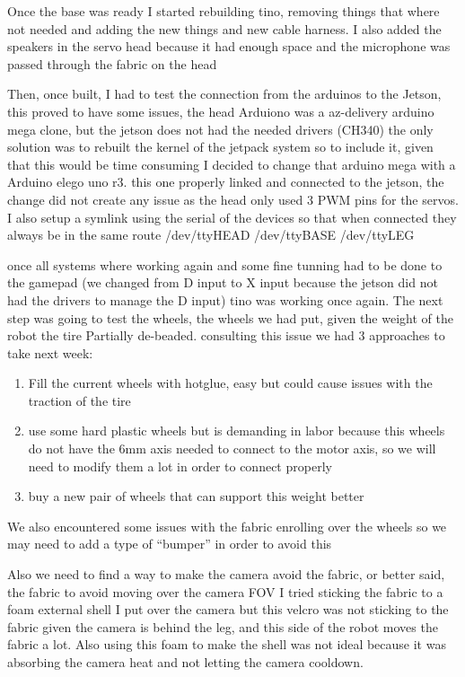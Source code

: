 Once the base was ready I started rebuilding tino, removing things that where not needed and adding the new things and new cable harness. I also added the speakers in the servo head because it had enough space and the microphone was passed through the fabric on the head

Then, once built, I had to test the connection from the arduinos to the Jetson, this proved to have some issues, the head Arduiono was a az-delivery arduino mega clone, but the jetson does not had the needed drivers (CH340) the only solution was to rebuilt the kernel of the jetpack system so to include it, given that this would be time consuming I decided to change that arduino mega with a Arduino elego uno r3. this one properly linked and connected to the jetson, the change did not create any issue as the head only used 3 PWM pins for the servos.
I also setup a symlink using the serial of the devices so that when connected they always be in the same route /dev/ttyHEAD /dev/ttyBASE /dev/ttyLEG

once all systems where working again and some fine tunning had to be done to the gamepad (we changed from D input to X input because the jetson did not had the drivers to manage the D input) tino was working once again. The next step was going to test the wheels, the wheels we had put, given the weight of the robot the tire Partially de-beaded. consulting this issue we had 3 approaches to take next week:

\begin{enumerate}
\item Fill the current wheels with hotglue, easy but could cause issues with the traction of the tire
\item use some hard plastic wheels but is demanding in labor because this wheels do not have the 6mm axis needed to connect to the motor axis, so we will need to modify them a lot in order to connect properly
\item buy a new pair of wheels that can support this weight better
\end{enumerate}

We also encountered some issues with the fabric enrolling over the wheels so we may need to add a type of ``bumper'' in order to avoid this

Also we need to find a way to make the camera avoid the fabric, or better said, the fabric to avoid moving over the camera FOV
I tried sticking the fabric to a foam external shell I put over the camera but this velcro was not sticking to the fabric given the camera is behind the leg, and this side of the robot moves the fabric a lot. Also using this foam to make the shell was not ideal because it was absorbing the camera heat and not letting the camera cooldown.

